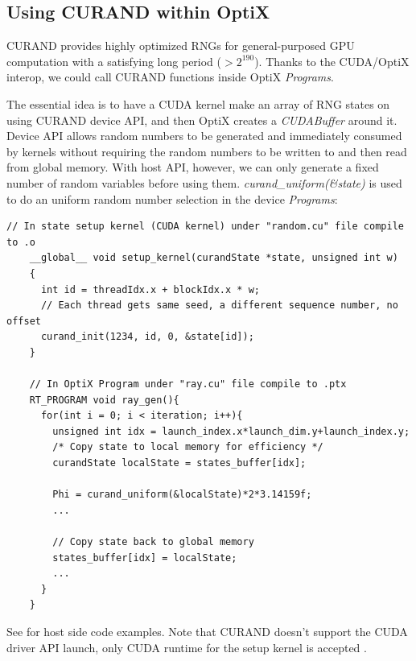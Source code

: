 
\subsection{Using CURAND within OptiX}
CURAND provides highly optimized RNGs for general-purposed GPU computation with a satisfying long period ($> 2^{190}$). Thanks to the CUDA/OptiX interop, we could call CURAND functions inside OptiX \textit{Programs}. 

The essential idea is to have a CUDA kernel make an array of RNG states on using CURAND device API, and then OptiX creates a \textit{CUDABuffer} around it. Device API allows random numbers to be generated and immediately consumed by kernels without requiring the random numbers to be written to and then read from global memory. With host API, however, we can only generate a fixed number of random variables before using them. \textit{curand\_uniform(\&state)} is used to do an uniform random number selection in the device \textit{Programs}:
\begin{lstlisting}[mathescape]
    // In state setup kernel (CUDA kernel) under "random.cu" file compile to .o
    __global__ void setup_kernel(curandState *state, unsigned int w)
    {
      int id = threadIdx.x + blockIdx.x * w;
      // Each thread gets same seed, a different sequence number, no offset
      curand_init(1234, id, 0, &state[id]);
    }

    // In OptiX Program under "ray.cu" file compile to .ptx
    RT_PROGRAM void ray_gen(){   
      for(int i = 0; i < iteration; i++){
        unsigned int idx = launch_index.x*launch_dim.y+launch_index.y;
        /* Copy state to local memory for efficiency */
        curandState localState = states_buffer[idx];
        
        Phi = curand_uniform(&localState)*2*3.14159f;
        ...
        
        // Copy state back to global memory 
        states_buffer[idx] = localState;
        ...
      }
    }
\end{lstlisting}
See  for host side code examples. Note that CURAND doesn't support the CUDA driver API launch, only CUDA runtime for the setup kernel is accepted \citep{curand}.


